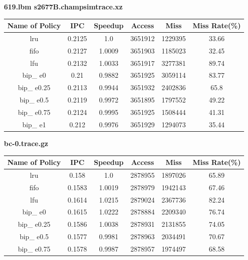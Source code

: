 \documentclass{article}
\begin{document}
\begin{description}
\begin{table}[H]
\begin{tabular}{|c|c|c|c|c|c|}
\end{tabular}
\end{table}
  \item \textbf{619.lbm s2677B.champsimtrace.xz}\\
    \begin{table}[H]
  \centering
  \begin{tabular}{|c|c|c|c|c|c|}
  \hline
  \textbf{Name of Policy} & \textbf{IPC} & \textbf{Speedup} & \textbf{Access} & \textbf{Miss} & \textbf{Miss Rate(\%)}\\ \hline
lru & 0.2125 & 1.0 & 3651912 & 1229395 & 33.66 \\ \hline
fifo & 0.2127 & 1.0009 & 3651903 & 1185023 & 32.45 \\ \hline
lfu & 0.2132 & 1.0033 & 3651917 & 3277381 & 89.74 \\ \hline
bip\_ e0 & 0.21 & 0.9882 & 3651925 & 3059114 & 83.77 \\ \hline
bip\_ e0.25 & 0.2113 & 0.9944 & 3651932 & 2402836 & 65.8 \\ \hline
bip\_ e0.5 & 0.2119 & 0.9972 & 3651895 & 1797552 & 49.22 \\ \hline
bip\_ e0.75 & 0.2124 & 0.9995 & 3651925 & 1508444 & 41.31 \\ \hline
bip\_ e1 & 0.212 & 0.9976 & 3651929 & 1294073 & 35.44 \\ \hline
\end{tabular}
\end{table}
  \item \textbf{bc-0.trace.gz}\\
  \begin{table}[H]
  \centering
  \begin{tabular}{|c|c|c|c|c|c|}
  \hline
  \textbf{Name of Policy} & \textbf{IPC} & \textbf{Speedup} & \textbf{Access} & \textbf{Miss} & \textbf{Miss Rate(\%)}\\ \hline
lru & 0.158 & 1.0 & 2878955 & 1897026 & 65.89 \\ \hline
fifo & 0.1583 & 1.0019 & 2878979 & 1942143 & 67.46 \\ \hline
lfu & 0.1614 & 1.0215 & 2879024 & 2367736 & 82.24 \\ \hline
bip\_ e0 & 0.1615 & 1.0222 & 2878884 & 2209340 & 76.74 \\ \hline
bip\_ e0.25 & 0.1586 & 1.0038 & 2878931 & 2131855 & 74.05 \\ \hline
bip\_ e0.5 & 0.1577 & 0.9981 & 2878963 & 2034491 & 70.67 \\ \hline
bip\_ e0.75 & 0.1578 & 0.9987 & 2878957 & 1974497 & 68.58 \\ \hline

\end{tabular}
\end{table}
\end{description}
\end{document}
